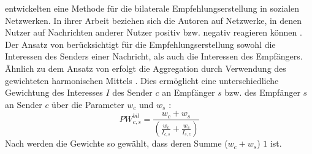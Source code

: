 \textcite[S. 247ff.]{kim:2:inproceedings} entwickelten eine Methode für die bilaterale Empfehlungserstellung in sozialen Netzwerken.
In ihrer Arbeit beziehen sich die Autoren auf Netzwerke, in denen Nutzer auf Nachrichten anderer Nutzer positiv bzw. negativ reagieren können \cite[S. 548]{koprinska:inbook}.
Der Ansatz von \textcite[S. 247ff.]{kim:2:inproceedings} berücksichtigt für die Empfehlungserstellung sowohl die Interessen des Senders einer Nachricht, als auch die Interessen des Empfängers.
Ähnlich zu dem Ansatz von \textcite[S. 207ff.]{pizzato:2010} erfolgt die Aggregation durch Verwendung des gewichteten harmonischen Mittels \cite[S. 251]{kim:2:inproceedings}.
Dies ermöglicht eine unterschiedliche Gewichtung des Interesses $I$ des Sender $c$ an Empfänger $s$ bzw. des Empfänger $s$ an Sender $c$ über die Parameter $w_{c}$ und $w_{s}$ \cite[S. 251]{kim:2:inproceedings}:
\begin{equation}\label{eq34}
    PW_{c,s}^{bil} = \frac{w_{c}+w_{s}}{(\frac{w_{c}}{I_{c,s}}+\frac{w_{s}}{I_{s,c}})}
\end{equation}
Nach \textcite[S. 219]{kim:2:inproceedings} werden die Gewichte so gewählt, dass deren Summe ($w_{c}+w_{s}$) $1$ ist.


